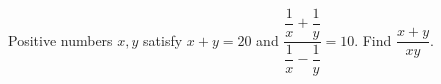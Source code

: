 Positive numbers $x,y$ satisfy $x+y=20$ and $\dfrac{\dfrac{1}{x}+\dfrac{1}{y}}{\dfrac{1}{x}-\dfrac{1}{y}}=10$. Find $\dfrac{x+y}{xy}$.
